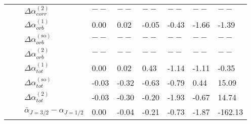 \begin{longtable}{lllllllll}
      &       & $\Delta \alpha_{corr}^{(\text{2})}$ &            $--$ &           $--$ &         $--$ &           $--$ &         $--$ &          $--$ \\
      &       & $\Delta \alpha_{orb}^{(\text{1})}$ &           0.00 &          0.02 &       -0.05 &         -0.43 &       -1.66 &        -1.39 \\
      &       & $\Delta \alpha_{orb}^{(\text{so})}$ &            $--$ &           $--$ &         $--$ &           $--$ &         $--$ &          $--$ \\
      &       & $\Delta \alpha_{orb}^{(\text{2})}$ &            $--$ &           $--$ &         $--$ &           $--$ &         $--$ &          $--$ \\
      &       & $\Delta \alpha_{tot}^{(\text{1})}$ &           0.00 &          0.02 &        0.43 &         -1.14 &       -1.11 &        -0.35 \\
      &       & $\Delta \alpha_{tot}^{(\text{so})}$ &          -0.03 &         -0.32 &       -0.63 &         -0.79 &        0.44 &        15.09 \\
      &       & $\Delta \alpha_{tot}^{(\text{2})}$ &          -0.03 &         -0.30 &       -0.20 &         -1.93 &       -0.67 &        14.74 \\
      &       & $\bar{\alpha}_{J=3/2}-\alpha_{J=1/2}$ &           0.00 &         -0.04 &       -0.21 &         -0.73 &       -1.87 &      -162.13 \\
\end{longtable}
